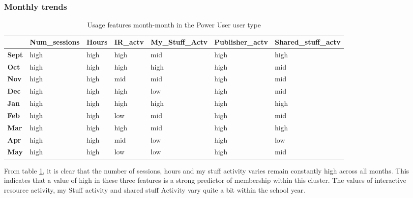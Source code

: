 \documentclass{acm_proc_article-sp}
\begin{document}
\subsubsection{Monthly trends}
\begin{table}
\caption{Usage features month-month in the Power User user type}
\label{cluster1month}
\begin{tabular}{|p{1cm}|p{1cm}|p{1cm}|p{1cm}|p{1cm}|p{1cm}|p{1cm}|}
 & Num\_sessions & Hours & IR\_actv & My\_Stuff\_Actv & Publisher\_actv & Shared\_stuff\_actv \\ \hline
\textbf{Sept} & high                                   & high  & high        & mid             & high           & high                \\ \hline
\textbf{Oct}   & high                                   & high  & high        & high            & high           & mid                 \\ \hline
\textbf{Nov}  & high                                   & high  & mid         & mid             & high           & mid                 \\ \hline
\textbf{Dec}  & high                                   & high  & high        & low             & high           & mid                 \\ \hline
\textbf{Jan}   & high                                   & high  & high        & high            & high           & high                \\ \hline
\textbf{Feb}  & high                                   & high  & low         & mid             & high           & mid                 \\ \hline
\textbf{Mar}     & high                                   & high  & high        & mid             & high           & high                \\ \hline
\textbf{Apr}     & high                                   & high  & mid         & low             & high           & low                 \\ \hline
\textbf{May}       & high                                   & high  & low         & low             & high           & mid                
\end{tabular}
\end{table}
From table \ref{cluster1month}, it is clear that the number of sessions, hours and my stuff activity varies remain constantly high across all months. This indicates that a value of high in these three features is a strong predictor of membership within this cluster.  The values of interactive resource activity, my Stuff activity and shared stuff Activity vary quite a bit within the school year.
\end{document}
